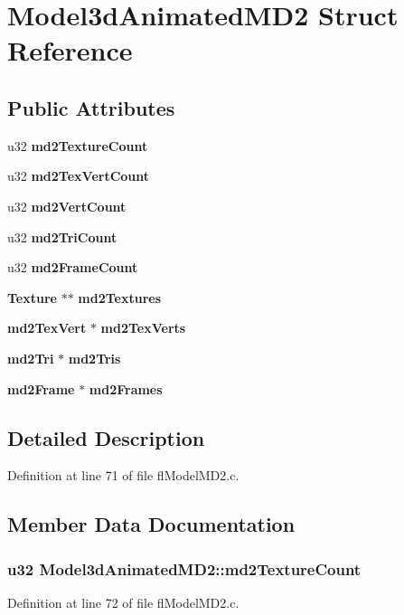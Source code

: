 \section{Model3d\-Animated\-MD2 Struct Reference}
\label{structModel3dAnimatedMD2}
\subsection*{Public Attributes}
\begin{CompactItemize}
\item 
u32 {\bf md2Texture\-Count}
\item 
u32 {\bf md2Tex\-Vert\-Count}
\item 
u32 {\bf md2Vert\-Count}
\item 
u32 {\bf md2Tri\-Count}
\item 
u32 {\bf md2Frame\-Count}
\item 
{\bf Texture} $\ast$$\ast$ {\bf md2Textures}
\item 
{\bf md2Tex\-Vert} $\ast$ {\bf md2Tex\-Verts}
\item 
{\bf md2Tri} $\ast$ {\bf md2Tris}
\item 
{\bf md2Frame} $\ast$ {\bf md2Frames}
\end{CompactItemize}


\subsection{Detailed Description}




Definition at line 71 of file fl\-Model\-MD2.c.

\subsection{Member Data Documentation}
\subsubsection{\setlength{\rightskip}{0pt plus 5cm}u32 {\bf Model3d\-Animated\-MD2::md2Texture\-Count}}\label{structModel3dAnimatedMD2_ed2383d4387b5cf609dc4a590a5e8e4b}




Definition at line 72 of file fl\-Model\-MD2.c.

